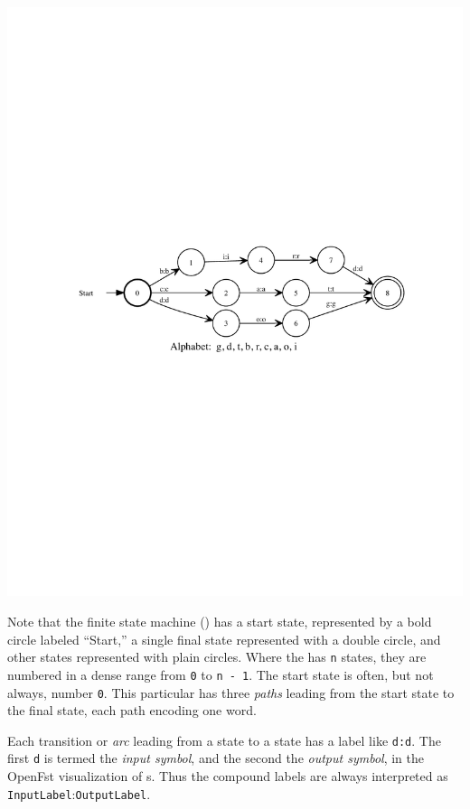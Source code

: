\begin{center}
\includegraphics[width=135mm]{images/dogcatbird.pdf}
\end{center}


Note that the finite state machine () has a start state, represented by a bold
circle labeled ``Start,'' a single final state represented with a double circle, and
other states
represented with plain circles.  Where the \fsm{} has \texttt{n} states, they are
numbered in a dense range from \texttt{0} to \texttt{n - 1}.  The start state is
often, but not always, number \texttt{0}.   This particular \fsm{} has three \emph{paths} leading from the
start state to the final state, each path encoding one word.

Each transition or \emph{arc} leading from a state to a
state has a label like \texttt{d:d}.  The first \texttt{d} is termed the \emph{input
symbol}, and the second the \emph{output symbol}, in the OpenFst visualization of
s.  Thus the compound labels are always interpreted as
\texttt{InputLabel}:\texttt{OutputLabel}.

